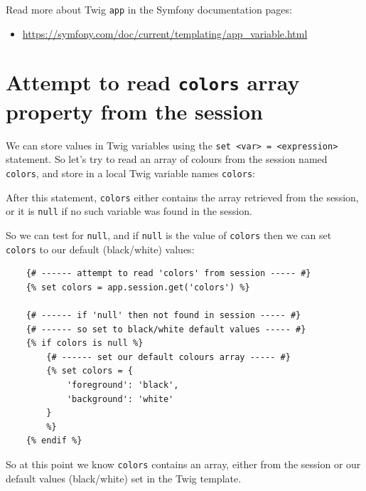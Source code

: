 \documentclass[a4paperpaper,openright]{book}
\newenvironment{Shaded}{}{}
\newcommand{\NormalTok}[1]{#1}
\providecommand{\tightlist}{%
  \setlength{\itemsep}{0pt}\setlength{\parskip}{0pt}}
\begin{document}
Read more about Twig \texttt{app} in the Symfony documentation pages:

\begin{itemize}
\tightlist
\item
  \url{https://symfony.com/doc/current/templating/app_variable.html}
\end{itemize}

\hypertarget{attempt-to-read-colors-array-property-from-the-session}{%
\section{\texorpdfstring{Attempt to read \texttt{colors} array property
from the
session}{Attempt to read colors array property from the session}}\label{attempt-to-read-colors-array-property-from-the-session}}

We can store values in Twig variables using the
\texttt{set\ \textless{}var\textgreater{}\ =\ \textless{}expression\textgreater{}}
statement. So let's try to read an array of colours from the session
named \texttt{colors}, and store in a local Twig variable names
\texttt{colors}:

\begin{Shaded}
\begin{Highlighting}[]
\NormalTok{    \{%
\end{Highlighting}
\end{Shaded}

After this statement, \texttt{colors} either contains the array
retrieved from the session, or it is \texttt{null} if no such variable
was found in the session.

So we can test for \texttt{null}, and if \texttt{null} is the value of
\texttt{colors} then we can set \texttt{colors} to our default
(black/white) values:

\begin{verbatim}
    {# ------ attempt to read 'colors' from session ----- #}
    {% set colors = app.session.get('colors') %}

    {# ------ if 'null' then not found in session ----- #}
    {# ------ so set to black/white default values ----- #}
    {% if colors is null %}
        {# ------ set our default colours array ----- #}
        {% set colors = {
            'foreground': 'black',
            'background': 'white'
        }
        %}
    {% endif %}
\end{verbatim}

So at this point we know \texttt{colors} contains an array, either from
the session or our default values (black/white) set in the Twig
template.
\end{document}
